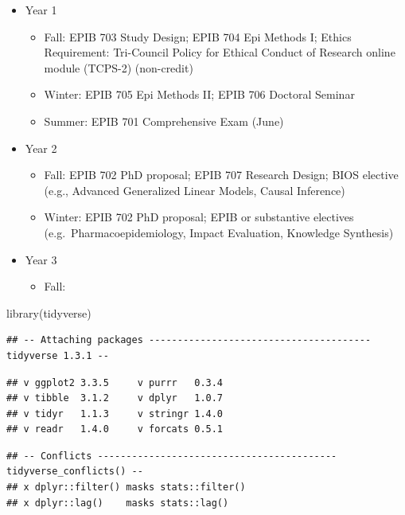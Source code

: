 \documentclass[
]{book}
\newenvironment{Shaded}{\begin{snugshade}}{\end{snugshade}}
\newcommand{\FunctionTok}[1]{\textcolor[rgb]{0.00,0.00,0.00}{#1}}
\newcommand{\NormalTok}[1]{#1}
\providecommand{\tightlist}{%
  \setlength{\itemsep}{0pt}\setlength{\parskip}{0pt}}
\begin{document}
\begin{itemize}
\tightlist
\item
  Year 1

  \begin{itemize}
  \tightlist
  \item
    Fall: EPIB 703 Study Design; EPIB 704 Epi Methods I; Ethics Requirement: Tri-Council Policy for Ethical Conduct of Research online module (TCPS-2) (non-credit)\\
  \item
    Winter: EPIB 705 Epi Methods II; EPIB 706 Doctoral Seminar
  \item
    Summer: EPIB 701 Comprehensive Exam (June)
  \end{itemize}
\item
  Year 2

  \begin{itemize}
  \tightlist
  \item
    Fall: EPIB 702 PhD proposal; EPIB 707 Research Design; BIOS elective (e.g., Advanced Generalized Linear Models, Causal Inference)
  \item
    Winter: EPIB 702 PhD proposal; EPIB or substantive electives (e.g.~Pharmacoepidemiology, Impact Evaluation, Knowledge Synthesis)
  \end{itemize}
\item
  Year 3

  \begin{itemize}
  \tightlist
  \item
    Fall:
  \end{itemize}
\end{itemize}

\begin{Shaded}
\begin{Highlighting}[]
\FunctionTok{library}\NormalTok{(tidyverse)}
\end{Highlighting}
\end{Shaded}

\begin{verbatim}
## -- Attaching packages --------------------------------------- tidyverse 1.3.1 --
\end{verbatim}

\begin{verbatim}
## v ggplot2 3.3.5     v purrr   0.3.4
## v tibble  3.1.2     v dplyr   1.0.7
## v tidyr   1.1.3     v stringr 1.4.0
## v readr   1.4.0     v forcats 0.5.1
\end{verbatim}

\begin{verbatim}
## -- Conflicts ------------------------------------------ tidyverse_conflicts() --
## x dplyr::filter() masks stats::filter()
## x dplyr::lag()    masks stats::lag()
\end{verbatim}
\end{document}
